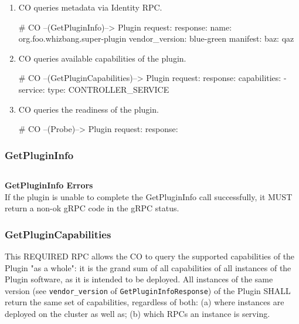 \documentclass[12pt]{article}
\begin{document}
\begin{enumerate}
  \item CO queries metadata via Identity RPC.

    \begin{bashcode}
       # CO --(GetPluginInfo)--> Plugin
       request:
       response:
          name: org.foo.whizbang.super-plugin
          vendor_version: blue-green
          manifest:
            baz: qaz
    \end{bashcode}


  \item CO queries available capabilities of the plugin.

    \begin{bashcode}
       # CO --(GetPluginCapabilities)--> Plugin
       request:
       response:
         capabilities:
           - service:
               type: CONTROLLER_SERVICE
    \end{bashcode}


  \item CO queries the readiness of the plugin.

    \begin{bashcode}
       # CO --(Probe)--> Plugin
       request:
       response: {}
    \end{bashcode}


\end{enumerate}

\subsubsection{GetPluginInfo}

\inputminted[breaklines,frame=lines,linenos,fontsize=\footnotesize]{proto}{src/getplugininfo.proto}

{\bfseries{GetPluginInfo Errors}} \\

If the plugin is unable to complete the GetPluginInfo call successfully,
it MUST return a non-ok gRPC code in the gRPC status.

\subsubsection{GetPluginCapabilities}

This REQUIRED RPC allows the CO to query the supported capabilities of
the Plugin "as a whole": it is the grand sum of all capabilities of all
instances of the Plugin software, as it is intended to be deployed. All
instances of the same version (see \verb=vendor_version= of
\verb=GetPluginInfoResponse=) of the Plugin SHALL return the same set of
capabilities, regardless of both: (a) where instances are deployed on
the cluster as well as; (b) which RPCs an instance is serving.
\end{document}
